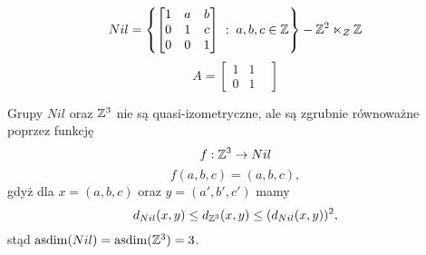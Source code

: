 $$Nil=\left\{ \begin{bmatrix}1&a&b\\0&1&c\\0&0&1\end{bmatrix}\;:\;a,b,c\in\mathbb{Z} \right\}-\mathbb{Z}^2\ltimes_Z\mathbb{Z}$$
$$A=\begin{bmatrix}1&1&\\0&1\end{bmatrix}$$

Grupy $Nil$ oraz $\mathbb{Z}^3$ nie są quasi-izometryczne, ale są zgrubnie równoważne poprzez funkcję
$$f:\mathbb{Z}^3\to Nil$$
$$f(a,b,c)=(a,b,c),$$
gdyż dla $x=(a,b,c)$ oraz $y=(a',b',c')$ mamy
$$d_{Nil}(x,y)\leq d_{\mathbb{Z}^3}(x,y)\leq(d_{Nil}(x,y))^2,$$
stąd $\operatorname{asdim}(Nil)=\operatorname{asdim}(\mathbb{Z}^3)=3$.

